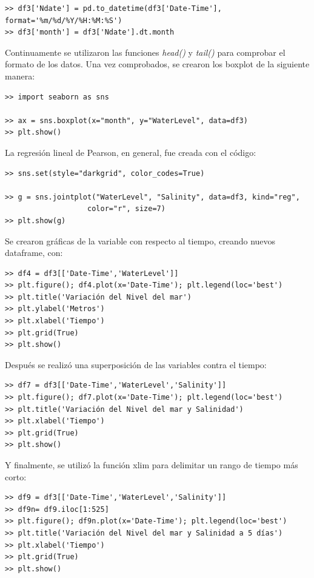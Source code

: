 \documentclass[a4paper]{article}
\begin{document}
\begin{verbatim}
>> df3['Ndate'] = pd.to_datetime(df3['Date-Time'], format='%m/%d/%Y/%H:%M:%S')
>> df3['month'] = df3['Ndate'].dt.month
\end{verbatim}

Continuamente se utilizaron las funciones \textit{head()} y \textit{tail()} para comprobar el formato de los datos. Una vez comprobados, se crearon los boxplot de la siguiente manera:

\begin{verbatim}
>> import seaborn as sns

>> ax = sns.boxplot(x="month", y="WaterLevel", data=df3)
>> plt.show()
\end{verbatim}

La regresión lineal de Pearson, en general, fue creada con el código:

\begin{verbatim}
>> sns.set(style="darkgrid", color_codes=True)

>> g = sns.jointplot("WaterLevel", "Salinity", data=df3, kind="reg",
                   color="r", size=7)
>> plt.show(g)
\end{verbatim}

Se crearon gráficas de la variable con respecto al tiempo, creando nuevos dataframe, con:

\begin{verbatim}
>> df4 = df3[['Date-Time','WaterLevel']]
>> plt.figure(); df4.plot(x='Date-Time'); plt.legend(loc='best')
>> plt.title('Variación del Nivel del mar')
>> plt.ylabel('Metros')
>> plt.xlabel('Tiempo')
>> plt.grid(True)
>> plt.show()
\end{verbatim}

Después se realizó una superposición de las variables contra el tiempo:

\begin{verbatim}
>> df7 = df3[['Date-Time','WaterLevel','Salinity']]
>> plt.figure(); df7.plot(x='Date-Time'); plt.legend(loc='best')
>> plt.title('Variación del Nivel del mar y Salinidad')
>> plt.xlabel('Tiempo')
>> plt.grid(True)
>> plt.show()
\end{verbatim}

Y finalmente, se utilizó la función xlim para delimitar un rango de tiempo más corto:

\begin{verbatim}
>> df9 = df3[['Date-Time','WaterLevel','Salinity']]
>> df9n= df9.iloc[1:525]
>> plt.figure(); df9n.plot(x='Date-Time'); plt.legend(loc='best')
>> plt.title('Variación del Nivel del mar y Salinidad a 5 días')
>> plt.xlabel('Tiempo')
>> plt.grid(True)
>> plt.show()
\end{verbatim}
\end{document}
